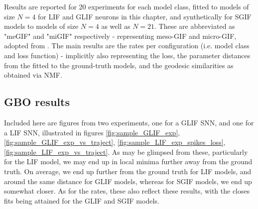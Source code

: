 \documentclass[mphil,deptreport,ianc]{infthesis} %
\begin{document}
Results are reported for 20 experiments for each model class, fitted to models of size $N=4$ for LIF and GLIF neurons in this chapter, and synthetically for SGIF models to models of size $N=4$ as well as $N=21$.
These are abbreviated as "meGIF" and "miGIF" respectively - representing meso-GIF and micro-GIF, adopted from \cite{Rene2020}.
The main results are the rates per configuration (i.e. model class and loss function) - implicitly also representing the loss, the parameter distances from the fitted to the ground-truth models, and the geodesic similarities as obtained via NMF.

\subsection{GBO results}


Included here are figures from two experiments, one for a GLIF SNN, and one for a LIF SNN, illustrated in figures \ref{fig:sample_GLIF_exp}, \ref{fig:sample_GLIF_exp_vs_traject}, \ref{fig:sample_LIF_exp_spikes_loss}, \ref{fig:sample_LIF_exp_vs_traject}.
As may be glimpsed from these, particularly for the LIF model, we may end up in local minima further away from the ground truth. On average, we end up further from the ground truth for LIF models, and around the same distance for GLIF models, whereas for SGIF models, we end up somewhat closer.
As for the rates, these also reflect these results, with the closes fits being attained for the GLIF and SGIF models.
\end{document}
